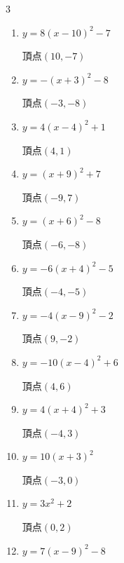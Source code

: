 \begin{multicols}{3}
\begin{enumerate}
        $\displaystyle 頂点\left( 6 , -5 \right)$

  \item $\displaystyle y=8\left( x-10\right)^{2}-7$

        $\displaystyle 頂点\left( 10 , -7 \right)$

\columnbreak %

  \item $\displaystyle y=-\left( x+3\right)^{2}-8$

        $\displaystyle 頂点\left( -3 , -8 \right)$

  \item $\displaystyle y=4\left( x-4\right)^{2}+1$

        $\displaystyle 頂点\left( 4 , 1 \right)$

  \item $\displaystyle y=\left( x+9\right)^{2}+7$

        $\displaystyle 頂点\left( -9 , 7 \right)$

  \item $\displaystyle y=\left( x+6\right)^{2}-8$

        $\displaystyle 頂点\left( -6 , -8 \right)$

  \item $\displaystyle y=-6\left( x+4\right)^{2}-5$

        $\displaystyle 頂点\left( -4 , -5 \right)$

  \item $\displaystyle y=-4\left( x-9\right)^{2}-2$

        $\displaystyle 頂点\left( 9 , -2 \right)$

  \item $\displaystyle y=-10\left( x-4\right)^{2}+6$

        $\displaystyle 頂点\left( 4 , 6 \right)$

  \item $\displaystyle y=4\left( x+4\right)^{2}+3$

        $\displaystyle 頂点\left( -4 , 3 \right)$

  \item $\displaystyle y=10\left( x+3\right)^{2}$

        $\displaystyle 頂点\left( -3 , 0 \right)$

  \item $\displaystyle y=3x^{2}+2$

        $\displaystyle 頂点\left( 0 , 2 \right)$

  \item $\displaystyle y=7\left( x-9\right)^{2}-8$


\end{enumerate}
\end{multicols}
